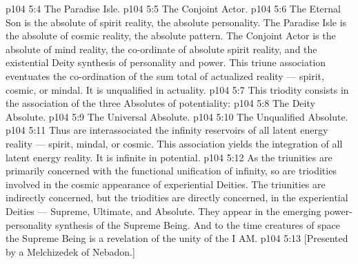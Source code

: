 \vs p104 5:4 \bibnobreakspace The Paradise Isle.
\vs p104 5:5 \bibnobreakspace The Conjoint Actor.
\vs p104 5:6 \pc The Eternal Son is the absolute of spirit reality, the absolute personality. The Paradise Isle is the absolute of cosmic reality, the absolute pattern. The Conjoint Actor is the absolute of mind reality, the co\hyp{}ordinate of absolute spirit reality, and the existential Deity synthesis of personality and power. This triune association eventuates the co\hyp{}ordination of the sum total of actualized reality --- spirit, cosmic, or mindal. It is unqualified in actuality.
\vs p104 5:7 \pc {} This triodity consists in the association of the three Absolutes of potentiality:
\vs p104 5:8 \bibnobreakspace The Deity Absolute.
\vs p104 5:9 \bibnobreakspace The Universal Absolute.
\vs p104 5:10 \bibnobreakspace The Unqualified Absolute.
\vs p104 5:11 \pc Thus are interassociated the infinity reservoirs of all latent energy reality --- spirit, mindal, or cosmic. This association yields the integration of all latent energy reality. It is infinite in potential.
\vs p104 5:12 \pc As the triunities are primarily concerned with the functional unification of infinity, so are triodities involved in the cosmic appearance of experiential Deities. The triunities are indirectly concerned, but the triodities are directly concerned, in the experiential Deities --- Supreme, Ultimate, and Absolute. They appear in the emerging power\hyp{}personality synthesis of the Supreme Being. And to the time creatures of space the Supreme Being is a revelation of the unity of the I AM.
\vsetoff
\vs p104 5:13 [Presented by a Melchizedek of Nebadon.]
\quizlink
